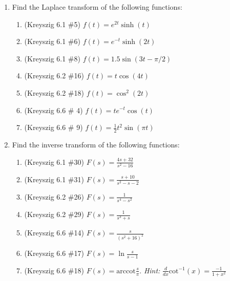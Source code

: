 \documentclass[letterpaper, fontsize=12pt]{scrartcl} %
\numberwithin{equation}{section} %
\numberwithin{figure}{section} %
\numberwithin{table}{section} %
\begin{document}
\begin{enumerate}

\item Find the Laplace transform of the following functions:
\begin{enumerate}
\item (Kreyszig 6.1 \#5) $f(t) = e^{2t}\sinh(t)$

\item (Kreyszig 6.1 \#6) $f(t) = e^{-t}\sinh(2t)$

\item (Kreyszig 6.1 \#8) $f(t) = 1.5 \sin (3t - \pi/2)$

\item (Kreyszig 6.2 \#16) $f(t) = t \cos (4t)$

\item (Kreyszig 6.2 \#18) $f(t) = \cos^2 (2t)$

\item (Kreyszig 6.6 \# 4) $f(t) = te^{-t}\cos(t)$

\item (Kreyszig 6.6 \# 9) $f(t) = \frac{1}{2}t^2\sin(\pi t)$


\end{enumerate}

\item Find the inverse transform of the following functions:
\begin{enumerate}
\item (Kreyszig 6.1 \#30) $F(s) = \frac{4s + 32}{s^2 - 16}$

\item (Kreyszig 6.1 \#31) $F(s) = \frac{s + 10}{s^2 - s - 2}$

\item (Kreyszig 6.2 \#26) $F(s) = \frac{ 1}{s^4 - s^2} $

\item (Kreyszig 6.2 \#29) $F(s) = \frac{ 1}{s^3 + s} $

\item (Kreyszig 6.6 \#14) $F(s) = \frac{s}{(s^2 + 16)^2}$

\item (Kreyszig 6.6 \#17) $F(s) = \ln \frac{s}{s-1} $

\item (Kreyszig 6.6 \#18) $F(s) = \text{arccot}\frac{s}{\pi} $. \textit{Hint:} $\frac{d}{dx} \text{cot}^{-1}(x) =\frac{-1}{1 + x^2}$

\end{enumerate}




\end{enumerate}
\end{document}
